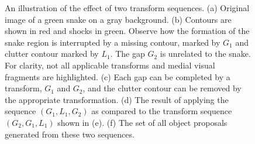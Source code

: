 \begin{figure}[p]
\caption{An illustration of the effect of two transform sequences. (a) Original image of a green snake on a gray background. (b) Contours are shown in red and shocks in green. Observe how the formation of the snake region is interrupted by a missing contour, marked by $G_1$ and clutter contour marked by $L_1$. The gap $G_2$ is unrelated to the snake. For clarity, not all applicable transforms and medial visual fragments are highlighted. (c) Each gap can be completed by a transform, $G_1$ and $G_2$, and the clutter contour can be removed by the appropriate transformation. (d) The result of applying the sequence $(G_1,L_1,G_2)$ as compared to the transform sequence $(G_2,G_1,L_1)$ shown in (e). (f) The set of all object proposals generated from these two sequences. }
\label{fig:snake_seq}
\end{figure}

